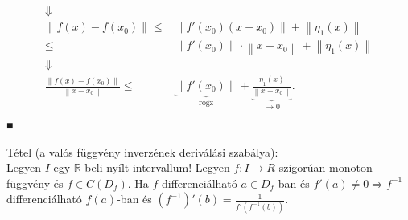 \documentclass[12pt,a4paper]{scrartcl}
\newenvironment{tetel}{}{}
\newenvironment{bizonyitas}{}{}
\begin{document}
\begin{bizonyitas}
\[\begin{aligned}
   \Downarrow  &  \\ 
  \left\| {f\left( x \right) - f\left( {{x_0}} \right)} \right\| \leqslant  & \left\| {f'\left( {{x_0}} \right)\left( {x - {x_0}} \right)} \right\| + \left\| {{\eta _1}\left( x \right)} \right\| \\ 
   \leqslant  & \left\| {f'\left( {{x_0}} \right)} \right\| \cdot \left\| {x - {x_0}} \right\| + \left\| {{\eta _1}\left( x \right)} \right\| \\ 
   \Downarrow  &  \\ 
  \frac{{\left\| {f\left( x \right) - f\left( {{x_0}} \right)} \right\|}}{{\left\| {x - {x_0}} \right\|}} \leqslant  & \underbrace {\left\| {f'\left( {{x_0}} \right)} \right\|}_{{\text{rögz}}} + \underbrace {\frac{{{\eta _1}\left( x \right)}}{{\left\| {x - {x_0}} \right\|}}}_{ \to 0} .\\ 
\end{aligned} \] ■

\end{bizonyitas}

\begin{tetel}

Tétel (a valós függvény inverzének deriválási szabálya):\\
Legyen \(I\) egy \(\mathbb{R}\)-beli nyílt intervallum! Legyen
\(\left. f:I\rightarrow R \right.\) szigorúan monoton függvény és
\(f \in C\left( D_{f} \right)\). Ha \(f\) differenciálható
\(a \in D_{f}\)-ban és
\(\left. f'\left( a \right) \neq 0\Rightarrow f^{- 1} \right.\)
differenciálható \(f\left( a \right)\)-ban és
\(\left( f^{- 1} \right)'\left( b \right) = \frac{1}{f'\left( {f^{- 1}\left( b \right)} \right)}\).

\end{tetel}
\end{document}
